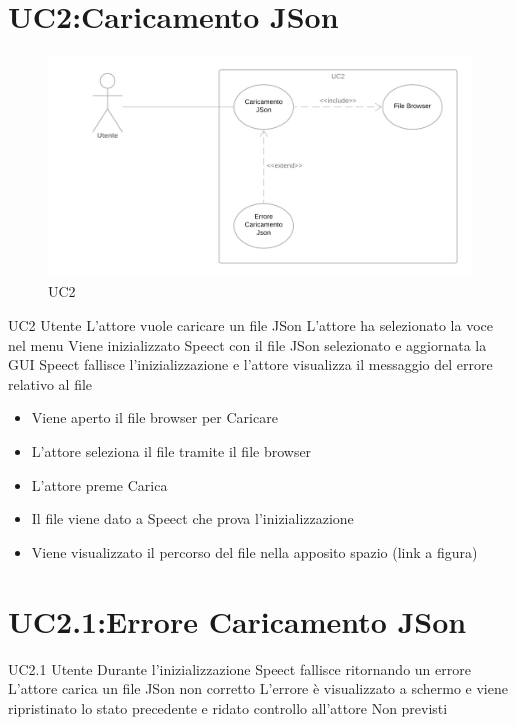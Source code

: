 \documentclass[../AnalisideiRequisiti.tex]{subfiles}
\begin{document}
	\section{UC2:Caricamento JSon}
	\begin{figure}[H]
		\caption{UC2}
		\centering
		\includegraphics[width=\textwidth]{../img/UC02.png}
	\end{figure}
	\UserCase
	{UC2}
	{Utente}
	{}
	{L'attore vuole caricare un file JSon}
	{L'attore ha selezionato la voce nel menu}
	{Viene inizializzato Speect con il file JSon selezionato e aggiornata la GUI}
	{Speect fallisce l'inizializzazione e l'attore visualizza il messaggio del errore relativo al file }
	{
		\begin{itemize}
			\item{} Viene aperto il file browser per Caricare
			\item{} L'attore seleziona il file tramite il file browser 
			\item{} L'attore preme Carica
			\item{} Il file viene dato a Speect che prova l'inizializzazione
			\item{} Viene visualizzato il percorso del file nella apposito spazio (link a figura)
		\end{itemize}
	}
	\section{UC2.1:Errore Caricamento JSon}
	\UserCase
	{UC2.1}
	{Utente}
	{}
	{Durante l'inizializzazione Speect fallisce ritornando un errore }
	{L'attore carica un file JSon non corretto}
	{L'errore è visualizzato a schermo e viene ripristinato lo stato precedente e ridato controllo all'attore}
	{Non previsti}
	{}

	
\end{document}
